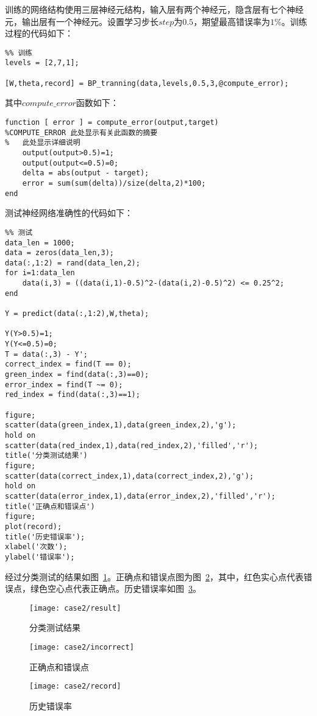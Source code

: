训练的网络结构使用三层神经元结构，输入层有两个神经元，隐含层有七个神经元，输出层有一个神经元。设置学习步长$step$为$0.5$，期望最高错误率为$1$\%。训练过程的代码如下：

\begin{lstlisting}
%% 训练
levels = [2,7,1];

[W,theta,record] = BP_tranning(data,levels,0.5,3,@compute_error);
\end{lstlisting}

其中$compute\_error$函数如下：

\begin{lstlisting}
function [ error ] = compute_error(output,target)
%COMPUTE_ERROR 此处显示有关此函数的摘要
%   此处显示详细说明
    output(output>0.5)=1;
    output(output<=0.5)=0;
    delta = abs(output - target);
    error = sum(sum(delta))/size(delta,2)*100;
end
\end{lstlisting}

测试神经网络准确性的代码如下：

\begin{lstlisting}
%% 测试
data_len = 1000;
data = zeros(data_len,3);
data(:,1:2) = rand(data_len,2);
for i=1:data_len
    data(i,3) = ((data(i,1)-0.5)^2-(data(i,2)-0.5)^2) <= 0.25^2;
end

Y = predict(data(:,1:2),W,theta);

Y(Y>0.5)=1;
Y(Y<=0.5)=0;
T = data(:,3) - Y';
correct_index = find(T == 0);
green_index = find(data(:,3)==0);
error_index = find(T ~= 0);
red_index = find(data(:,3)==1);

figure;
scatter(data(green_index,1),data(green_index,2),'g');
hold on
scatter(data(red_index,1),data(red_index,2),'filled','r');
title('分类测试结果')
figure;
scatter(data(correct_index,1),data(correct_index,2),'g');
hold on
scatter(data(error_index,1),data(error_index,2),'filled','r');
title('正确点和错误点')
figure;
plot(record);
title('历史错误率');
xlabel('次数');
ylabel('错误率');
\end{lstlisting}

经过分类测试的结果如图~\ref{fig:case2:result}。正确点和错误点图为图~\ref{fig:case2:incorrect}，其中，红色实心点代表错误点，绿色空心点代表正确点。历史错误率如图~\ref{fig:case2:record}。

\begin{figure}[h] 
 \centering
  \texttt{[image: case2/result]}
  \caption{分类测试结果}
  \label{fig:case2:result}
\end{figure}
\begin{figure}[h] 
 \centering
  \texttt{[image: case2/incorrect]}
  \caption{正确点和错误点}
  \label{fig:case2:incorrect}
\end{figure}
\begin{figure}[h] 
 \centering
  \texttt{[image: case2/record]}
  \caption{历史错误率}
  \label{fig:case2:record}
\end{figure}

